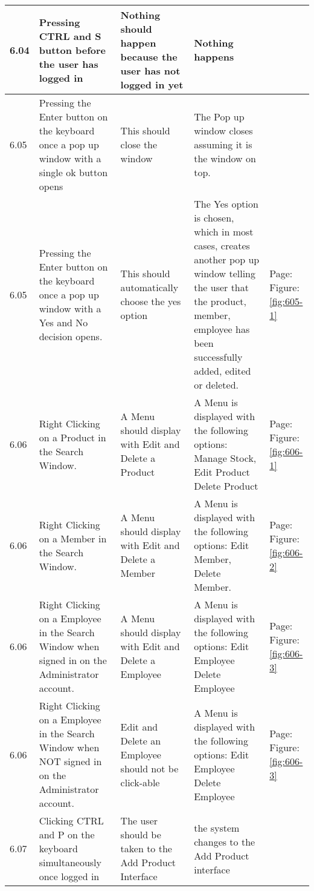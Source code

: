 \begin{flushleft}
\begin{longtable}{|p{1.0cm}|p{2.5cm}|p{3cm}|p{3.0cm}|p{2.5cm}|}
	6.04 & Pressing CTRL and S button before the user has logged in & Nothing should happen because the user has not logged in yet & Nothing happens& \\ \hline
	6.05 &  Pressing the Enter button on the keyboard once a pop up window with a single ok button opens & This should close the window & The Pop up window closes assuming it is the window on top.& \\ \hline
	6.05 &  Pressing the Enter button on the keyboard once a pop up window with a Yes and No decision opens. & This should automatically choose the yes option & The Yes option is chosen, which in most cases, creates another pop up window telling the user that the product, member, employee has been successfully added, edited or deleted.& Page:\pageref{fig:605-1}  \newline Figure:\ref{fig:605-1} \\ \hline
	6.06 & Right Clicking on a Product in the Search Window. & A Menu should display with Edit and Delete a Product & A Menu is displayed with the following options: Manage Stock, Edit Product Delete Product & Page:\pageref{fig:606-1}  \newline Figure:\ref{fig:606-1}\\ \hline
	6.06 & Right Clicking on a Member in the Search Window.& A Menu should display with Edit and Delete a Member & A Menu is displayed with the following options: Edit Member, Delete Member.&Page:\pageref{fig:606-2}  \newline Figure:\ref{fig:606-2} \\ \hline
	6.06 & Right Clicking on a Employee in the Search Window when signed in on the Administrator account. & A Menu should display with Edit and Delete a Employee & A Menu is displayed with the following options: Edit Employee Delete Employee& Page:\pageref{fig:606-3}  \newline Figure:\ref{fig:606-3}\\ \hline
	6.06 & Right Clicking on a Employee in the Search Window when NOT signed in on the Administrator account. & Edit and Delete an Employee should not be click-able &A Menu is displayed with the following options: Edit Employee Delete Employee & Page:\pageref{fig:606-3}  \newline Figure:\ref{fig:606-3}\\ \hline
	6.07 & Clicking CTRL and P on the keyboard simultaneously once logged in & The user should be taken to the Add Product Interface& the system changes to the Add Product interface& \\ \hline

\end{longtable}
\end{flushleft}
